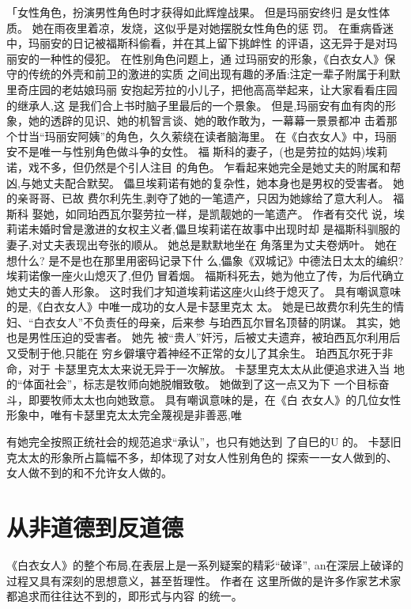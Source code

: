 \documentclass[portrait,a4paper]{article}
\begin{document}
「女性角色，扮演男性角色时才获得如此辉煌战果。 但是玛丽安终归
是女性体质。 她在雨夜里着凉，发烧，这似乎是对她摆脱女性角色的惩
罚。 在重病昏迷中，玛丽安的日记被福斯科偷看，并在其上留下挑衅性
的评语，这无异于是对玛丽安的一种性的侵犯。 在性别角色问题上，通
过玛丽安的形象，《白衣女人》保守的传统的外壳和前卫的激进的实质
之间出现有趣的矛盾:注定一辈子附属于利默里奇庄园的老姑娘玛丽
安抱起芳拉的小儿子，把他高高举起来，让大家看看庄园的继承人,这
是我们合上书时脑子里最后的一个景象。 但是,玛丽安有血有肉的形
象，她的透辟的见识、她的机智言谈、她的敢作敢为，一幕幕一景景都冲
击着那个廿当“玛丽安阿姨”的角色，久久萦绕在读者脑海里。
在《白衣女人》中，玛丽安不是唯一与性别角色做斗争的女性。 福
斯科的妻子，(也是劳拉的姑妈)埃莉诺，戏不多，但仍然是个引人注目
的角色。 乍看起来她完全是她丈夫的附属和帮凶,与她丈夫配合默契。
儡旦埃莉诺有她的复杂性，她本身也是男权的受害者。 她的亲哥哥、已故
费尔利先生,剥夺了她的一笔遗产，只因为她嫁给了意大利人。 福斯科
娶她，如同珀西瓦尔娶劳拉一样，是凯靓她的一笔遗产。 作者有交代
说，埃莉诺未婚时曾是激进的女权主义者,儡旦埃莉诺在故事中出现时却
是福斯科驯服的妻子,对丈夫表现出夸张的顺从。 她总是默默地坐在
角落里为丈夫卷炳叶。 她在想什么? 是不是也在那里用密码记录下什
么,儡象《双城记》中德法日太太的编织? 埃莉诺像一座火山熄灭了,但仍
冒着烟。 福斯科死去，她为他立了传，为后代确立她丈夫的善人形象。
这时我们才知道埃莉诺这座火山终于熄灭了。
具有嘲讽意味的是,《白衣女人》中唯一成功的女人是卡瑟里克太
太。 她是已故费尔利先生的情妇、“白衣女人”不负责任的母亲，后来参
与珀西瓦尔冒名顶替的阴谋。 其实，她也是男性压迫的受害者。 她先
被“贵人”奸污，后被丈夫遗弃，被珀西瓦尔利用后又受制于他,只能在
穷乡僻壤守着神经不正常的女儿了其余生。 珀西瓦尔死于非命，对于
卡瑟里克太太来说无异于一次解放。 卡瑟里克太太从此便追求进入当
地的“体面社会”，标志是牧师向她脱帽致敬。 她做到了这一点又为下
一个目标奋斗，即要牧师太太也向她致意。 具有嘲讽意味的是，在《白
衣女人》的几位女性形象中，唯有卡瑟里克太太完全蔑视是非善恶,唯

有她完全按照正统社会的规范追求“承认”，也只有她达到 了自巳的U
的。 卡瑟旧克太太的形象所占篇幅不多，却体现了对女人性别角色的
探索一一女人做到的、女人做不到的和不允许女人做的。

\section{从非道德到反道德}

《白衣女人》的整个布局,在表层上是一系列疑案的精彩“破译”,
an在深层上破译的过程又具有深刻的思想意义，甚至哲理性。 作者在
这里所做的是许多作家艺术家都追求而往往达不到的，即形式与内容
的统一。
\end{document}
